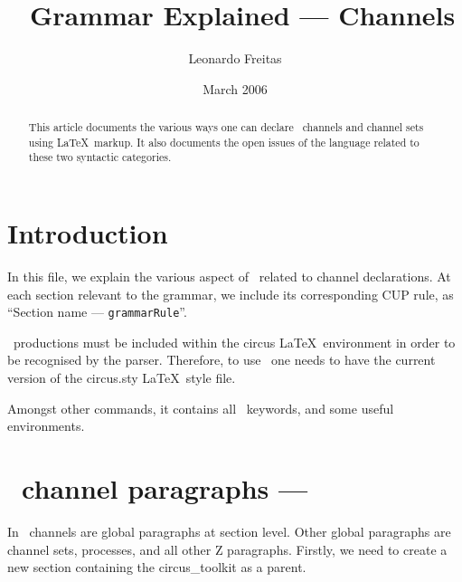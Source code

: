 \documentclass{article}
\begin{document}
\title{\Circus\ Grammar Explained --- Channels}
\author{Leonardo Freitas}
\date{March 2006}

\maketitle

\begin{abstract}
    \noindent This article documents the various ways one can declare \Circus\ channels and channel sets
    using \LaTeX\ markup.  It also documents the open issues of the language related to these two syntactic
    categories.
\end{abstract}

\section{Introduction}

In this file, we explain the various aspect of \Circus\ related to channel
declarations. At each section relevant to the grammar, we include its
corresponding CUP rule, as ``Section name --- \texttt{grammarRule}''.

\Circus\ productions must be included within the \textsf{circus} \LaTeX\
environment in order to be recognised by the parser. Therefore, to use \Circus\
one needs to have the current version of the \textsf{circus.sty} \LaTeX\ style
file.

Amongst other commands, it contains all \Circus\ keywords, and some useful
environments.

%
%

\section{\Circus\ channel paragraphs --- }

In \Circus\ channels are global paragraphs at section level. Other global
paragraphs are channel sets, processes, and all other Z paragraphs. Firstly, we
need to create a new section containing the \textsf{circus\_toolkit} as a
parent.
\end{document}
